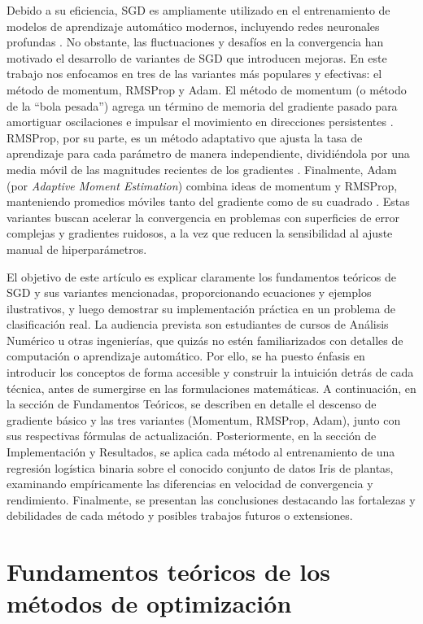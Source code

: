 \documentclass[12pt, spanish]{article}
\begin{document}
Debido a su eficiencia, SGD es ampliamente utilizado en el entrenamiento de modelos de aprendizaje automático modernos, incluyendo redes neuronales profundas \cite{ref10}. No obstante, las fluctuaciones y desafíos en la convergencia han motivado el desarrollo de variantes de SGD que introducen mejoras. En este trabajo nos enfocamos en tres de las variantes más populares y efectivas: el método de momentum, RMSProp y Adam. El método de momentum (o método de la “bola pesada”) agrega un término de memoria del gradiente pasado para amortiguar oscilaciones e impulsar el movimiento en direcciones persistentes \cite{ref4}. RMSProp, por su parte, es un método adaptativo que ajusta la tasa de aprendizaje para cada parámetro de manera independiente, dividiéndola por una media móvil de las magnitudes recientes de los gradientes \cite{ref3}. Finalmente, Adam (por \textit{Adaptive Moment Estimation}) combina ideas de momentum y RMSProp, manteniendo promedios móviles tanto del gradiente como de su cuadrado \cite{ref2}. Estas variantes buscan acelerar la convergencia en problemas con superficies de error complejas y gradientes ruidosos, a la vez que reducen la sensibilidad al ajuste manual de hiperparámetros.

El objetivo de este artículo es explicar claramente los fundamentos teóricos de SGD y sus variantes mencionadas, proporcionando ecuaciones y ejemplos ilustrativos, y luego demostrar su implementación práctica en un problema de clasificación real. La audiencia prevista son estudiantes de cursos de Análisis Numérico u otras ingenierías, que quizás no estén familiarizados con detalles de computación o aprendizaje automático. Por ello, se ha puesto énfasis en introducir los conceptos de forma accesible y construir la intuición detrás de cada técnica, antes de sumergirse en las formulaciones matemáticas. A continuación, en la sección de Fundamentos Teóricos, se describen en detalle el descenso de gradiente básico y las tres variantes (Momentum, RMSProp, Adam), junto con sus respectivas fórmulas de actualización. Posteriormente, en la sección de Implementación y Resultados, se aplica cada método al entrenamiento de una regresión logística binaria sobre el conocido conjunto de datos Iris de plantas, examinando empíricamente las diferencias en velocidad de convergencia y rendimiento. Finalmente, se presentan las conclusiones destacando las fortalezas y debilidades de cada método y posibles trabajos futuros o extensiones.

\section{Fundamentos teóricos de los métodos de optimización}
\end{document}
